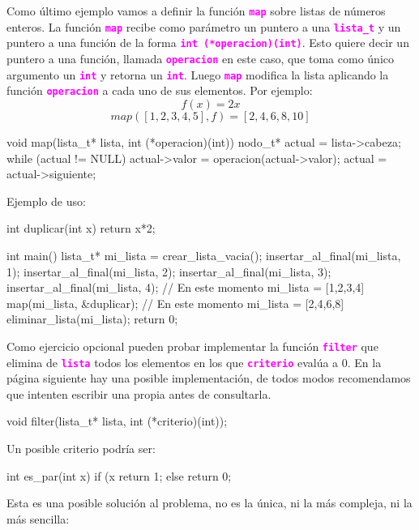 \documentclass[]{scrartcl}
\newcommand{\hl}[1]{\textcolor{magenta}{\textbf{\texttt{#1}}}}
\begin{document}
Como último ejemplo vamos a definir la función \hl{map} sobre listas de números enteros. La función \hl{map} recibe como parámetro un puntero a una \hl{lista\_t} y un puntero a una función de la forma \hl{int (*operacion)(int)}. Esto quiere decir un puntero a una función, llamada \hl{operacion} en este caso, que toma como único argumento un \hl{int} y retorna un \hl{int}. Luego \hl{map} modifica la lista aplicando la función \hl{operacion} a cada uno de sus elementos. 
Por ejemplo:
$$
f(x) = 2x
$$
$$
map([1,2,3,4,5], f) = [2,4,6,8,10]
$$

\newpage %

\begin{cbox}[unbreakable]{}
void map(lista_t* lista, int (*operacion)(int)) {
    nodo_t* actual = lista->cabeza;
    while (actual != NULL) {
        actual->valor = operacion(actual->valor);
        actual = actual->siguiente;
    }
}
\end{cbox}

Ejemplo de uso:

\begin{cbox}[unbreakable]{}
int duplicar(int x) {
    return x*2;
}

int main() {
    lista_t* mi_lista = crear_lista_vacia();
    insertar_al_final(mi_lista, 1);
    insertar_al_final(mi_lista, 2);
    insertar_al_final(mi_lista, 3);
    insertar_al_final(mi_lista, 4);
    // En este momento mi_lista = [1,2,3,4]
    map(mi_lista, &duplicar);
    // En este momento mi_lista = [2,4,6,8]
    eliminar_lista(mi_lista);
    return 0;
}
\end{cbox}

Como ejercicio opcional pueden probar implementar la función \hl{filter} que elimina de \hl{lista} todos los elementos en los que \hl{criterio} evalúa a 0. En la página siguiente hay una posible implementación, de todos modos recomendamos que intenten escribir una propia antes de consultarla.
\begin{bashbox}[minted language=C]
void filter(lista_t* lista, int (*criterio)(int));
\end{bashbox}

Un posible criterio podría ser:
\begin{cbox}[unbreakable]{}
int es_par(int x) {
    if (x %
        return 1;
    else
        return 0;
}
\end{cbox}

\newpage

Esta es una posible solución al problema, no es la única, ni la más compleja, ni la más sencilla:
\end{document}
